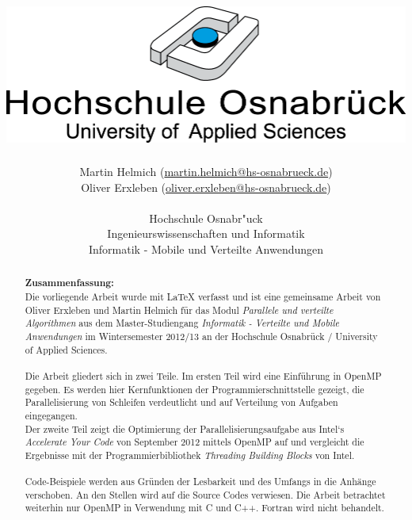 \documentclass[11pt]{scrartcl}
\begin{document}
\author{%
	Martin Helmich \small(\href{mailto:martin.helmich@hs-osnabrueck.de}{martin.helmich@hs-osnabrueck.de})\\%
	Oliver Erxleben \small(\href{mailto:oliver.erxleben@hs-osnabrueck.de}{oliver.erxleben@hs-osnabrueck.de})\\ \\%
	Hochschule Osnabr"uck \\%
	Ingenieurswissenschaften und Informatik \\%
	Informatik - Mobile und Verteilte Anwendungen }

\title{\includegraphics[scale=0.75,keepaspectratio]{img/hs_os.png}\linebreak \linebreak }

\maketitle
\thispagestyle{empty}
\tableofcontents
\listoffigures

\lstlistoflistings
\thispagestyle{empty}
\pagebreak
\thispagestyle{empty}
\begin{abstract}
\textbf{Zusammenfassung:}\\ 	
Die vorliegende Arbeit wurde mit LaTeX verfasst und ist eine gemeinsame Arbeit von Oliver Erxleben und Martin Helmich für das Modul \textit{Parallele und verteilte Algorithmen} aus dem Master-Studiengang \textit{Informatik - Verteilte und Mobile Anwendungen} im Wintersemester 2012/13 an der Hochschule Osnabrück / University of Applied Sciences. \\ 
\\
Die Arbeit gliedert sich in zwei Teile. Im ersten Teil wird eine Einführung in OpenMP gegeben. Es werden hier Kernfunktionen der Programmierschnittstelle gezeigt, die Parallelisierung von Schleifen verdeutlicht und auf Verteilung von Aufgaben eingegangen.\\
Der zweite Teil zeigt die Optimierung der Parallelisierungsaufgabe aus Intel`s \textit{Accelerate Your Code} von September 2012 mittels OpenMP auf und vergleicht die Ergebnisse mit der Programmierbibliothek \textit{Threading Building Blocks} von Intel.\\
\\
Code-Beispiele werden aus Gründen der Lesbarkeit und des Umfangs in die Anhänge verschoben. An den Stellen wird auf die Source Codes verwiesen. Die Arbeit betrachtet weiterhin nur OpenMP in Verwendung mit C und C++. Fortran wird nicht behandelt.
\end{abstract}
\end{document}
